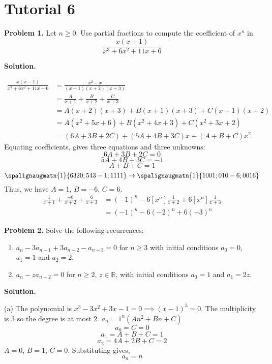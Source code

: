 \section{Tutorial 6}
\textbf{Problem 1.}
Let $ n\geqslant 0 $. Use partial fractions to compute the coefficient of $ x^n $
in
\[ \frac{x(x-1)}{x^3+6x^2+11x+6} \]

\textbf{Solution.}

\begin{align*} \frac{x(x-1)}{x^3+6x^2+11x+6}
     & =\frac{x^2-x}{(x+1)(x+2)(x+3)}                 \\
     & =\frac{A}{x+1} + \frac{B}{x+2} + \frac{C}{x+3} \\
     & =A(x+2)(x+3)+B(x+1)(x+3)+C(x+1)(x+2)           \\
     & =A(x^2+5x+6)+B(x^2+4x+3)+C(x^2+3x+2)           \\
     & =(6A+3B+2C) + (5A+4B+3C)x + (A+B+C)x^2
\end{align*}
Equating coefficients, gives three equations and three unknowns:
\[ 6A+3B+2C=0 \]
\[ 5A+4B+3C=-1 \]
\[ A+B+C=1 \]
\[
    \spalignaugmatn{1}{
        6 3 2 0  ;
        5 4 3 -1 ;
        1 1 1 1
    }
    \rightarrow{}
    \spalignaugmatn{1}{
        1 0 0 1  ;
        0 1 0 -6 ;
        0 0 1 6
    }
\]
Thus, we have $ A=1 $, $ B=-6 $, $ C=6 $.
\begin{align*}
    \frac{1}{x+1} + \frac{-6}{x+2} + \frac{6}{x+3}
     & = (-1)^n - 6[x^n]\frac{1}{x+2} + 6[x^n]\frac{1}{x+3} \\
     & = (-1)^n - 6 (-2)^n + 6(-3)^n
\end{align*}

\textbf{Problem 2.} Solve the following recurrences:
\begin{enumerate}[label=(\alph*)]
    \item $ a_n-3a_{n-1}+3a_{n-2}-a_{n-3}=0 $ for $ n\geqslant 3 $
          with initial conditions $ a_0=0 $, $ a_1=1 $ and $ a_2=2 $.
    \item $ a_n-za_{n-2}=0 $ for $ n\geqslant 2 $, $ z\in\mathbb{R} $,
          with initial conditions $ a_0=1 $ and $ a_1=2z $.
\end{enumerate}

\textbf{Solution.}

(a) The polynomial is $ x^3-3x^2+3x-1=0\implies (x-1)^3=0 $. The multiplicity
is $ 3 $ so the degree is at most $ 2 $.
$ a_n=1^n(An^2+Bn+C) $
\[ a_0=C=0 \]
\[ a_1=A+B+C=1 \]
\[ a_2=4A+2B+C=2 \]
$ A=0,\, B=1,\, C=0 $. Substituting gives,
\[ a_n=n \]

